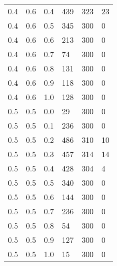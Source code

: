 \begin{table}[!htb]
\begin{minipage}{.45\linewidth}
\begin{tabular}{||p{}p{}p{}p{}p{}p{}||}
			0.4 & 0.6 & 0.4 & 439 & 323 & 23 \\ 
			0.4 & 0.6 & 0.5 & 345 & 300 & 0 \\ 
			0.4 & 0.6 & 0.6 & 213 & 300 & 0 \\ 
			0.4 & 0.6 & 0.7 & 74 & 300 & 0 \\ 
			0.4 & 0.6 & 0.8 & 131 & 300 & 0 \\ 
			0.4 & 0.6 & 0.9 & 118 & 300 & 0 \\ 
			0.4 & 0.6 & 1.0 & 128 & 300 & 0  \\ \hline
			0.5 & 0.5 & 0.0 & 29 & 300 & 0 \\ 
			0.5 & 0.5 & 0.1 & 236 & 300 & 0 \\ 
			0.5 & 0.5 & 0.2 & 486 & 310 & 10 \\ 
			0.5 & 0.5 & 0.3 & 457 & 314 & 14 \\ 
			0.5 & 0.5 & 0.4 & 428 & 304 & 4 \\ 
			0.5 & 0.5 & 0.5 & 340 & 300 & 0 \\ 
			0.5 & 0.5 & 0.6 & 144 & 300 & 0 \\ 
			0.5 & 0.5 & 0.7 & 236 & 300 & 0 \\ 
			0.5 & 0.5 & 0.8 & 54 & 300 & 0 \\ 
			0.5 & 0.5 & 0.9 & 127 & 300 & 0 \\ 
			0.5 & 0.5 & 1.0 & 15 & 300 & 0  \\ \hline
		\end{tabular}
	\end{minipage} 
\end{table} 

